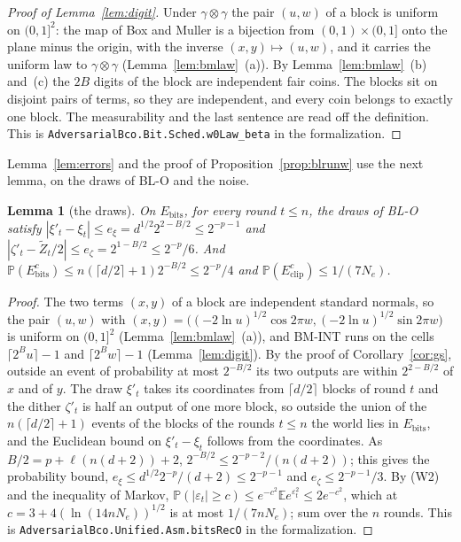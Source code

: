 \documentclass[11pt]{amsart}
\newtheorem{lemma}[theorem]{Lemma}
\theoremstyle{definition}
\numberwithin{equation}{section}
\newcommand{\E}{\mathbb{E}}
\newcommand{\Prob}{\mathbb{P}}
\begin{document}
\begin{proof}[Proof of Lemma~\ref{lem:digit}]
Under $\gamma\otimes\gamma$ the pair $(u,w)$ of a block is uniform on $(0,1]^2$: the map of Box and Muller is a bijection from $(0,1)\times(0,1]$ onto the plane minus the origin, with the inverse $(x,y)\mapsto(u,w)$, and it carries the uniform law to $\gamma\otimes\gamma$ (Lemma~\ref{lem:bmlaw}~(a)). By Lemma~\ref{lem:bmlaw}~(b) and~(c) the $2B$ digits of the block are independent fair coins. The blocks sit on disjoint pairs of terms, so they are independent, and every coin belongs to exactly one block. The measurability and the last sentence are read off the definition.
This is \texttt{AdversarialBco.Bit.Sched.w0Law\_beta} in the formalization.
\end{proof}

Lemma~\ref{lem:errors} and the proof of Proposition~\ref{prop:blrunw} use the next lemma, on the draws of BL-O and the noise.

\begin{lemma}[the draws]\label{lem:bits}
On $E_{\mathrm{bits}}$, for every round $t\le n$, the draws of BL-O satisfy $|\xi'_t-\xi_t|\le e_\xi=d^{1/2}2^{2-B/2}\le2^{-p-1}$ and $|\zeta'_t-\tilde Z_t/2|\le e_\zeta=2^{1-B/2}\le2^{-p}/6$. And $\Prob(E_{\mathrm{bits}}^c)\le n(\lceil d/2\rceil+1)2^{-B/2}\le2^{-p}/4$ and $\Prob(E_{\mathrm{clip}}^c)\le1/(7N_e)$.
\end{lemma}

\begin{proof}
The two terms $(x,y)$ of a block are independent standard normals, so the pair $(u,w)$ with $(x,y)=\bigl((-2\ln u)^{1/2}\cos2\pi w,(-2\ln u)^{1/2}\sin2\pi w\bigr)$ is uniform on $(0,1]^2$ (Lemma~\ref{lem:bmlaw}~(a)), and BM-INT runs on the cells $\lceil2^Bu\rceil-1$ and $\lceil2^Bw\rceil-1$ (Lemma~\ref{lem:digit}). By the proof of Corollary~\ref{cor:gs}, outside an event of probability at most $2^{-B/2}$ its two outputs are within $2^{2-B/2}$ of $x$ and of $y$. The draw $\xi'_t$ takes its coordinates from $\lceil d/2\rceil$ blocks of round $t$ and the dither $\zeta'_t$ is half an output of one more block, so outside the union of the $n(\lceil d/2\rceil+1)$ events of the blocks of the rounds $t\le n$ the world lies in $E_{\mathrm{bits}}$, and the Euclidean bound on $\xi'_t-\xi_t$ follows from the coordinates. As $B/2=p+\ell(n(d+2))+2$, $2^{-B/2}\le2^{-p-2}/(n(d+2))$; this gives the probability bound, $e_\xi\le d^{1/2}2^{-p}/(d+2)\le2^{-p-1}$ and $e_\zeta\le2^{-p-1}/3$. By (W2) and the inequality of Markov, $\Prob(|\varepsilon_t|\ge c)\le e^{-c^2}\E e^{\varepsilon_t^2}\le2e^{-c^2}$, which at $c=3+4(\ln(14nN_e))^{1/2}$ is at most $1/(7nN_e)$; sum over the $n$ rounds.
This is \texttt{AdversarialBco.Unified.Asm.bitsRecO} in the formalization.
\end{proof}
\end{document}
